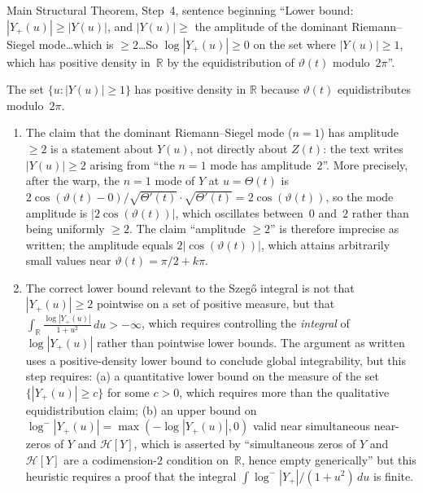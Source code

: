 \documentclass[11pt]{article}
\newcommand{\R}{\mathbb{R}}
\newcommand{\HH}{\mathcal{H}}
\begin{document}
\begin{description}[leftmargin=0pt]
\item[Location:]
Main Structural Theorem, Step~4, sentence beginning
``Lower bound: $|Y_+(u)|\ge|Y(u)|$, and $|Y(u)|\ge$ the amplitude of the dominant
Riemann--Siegel mode\ldots which is $\ge 2$\ldots So $\log|Y_+(u)|\ge 0$ on the set
where $|Y(u)|\ge 1$, which has positive density in~$\R$ by the equidistribution
of $\vartheta(t)$ modulo~$2\pi$''.

\item[Claim as written:]
The set $\{u:|Y(u)|\ge 1\}$ has positive density in $\R$ because
$\vartheta(t)$ equidistributes modulo~$2\pi$.

\item[What is relied on but not established in the text:]
\begin{enumerate}
\item The claim that the dominant Riemann--Siegel mode ($n=1$) has amplitude
$\ge 2$ is a statement about $Y(u)$, not directly about $Z(t)$:
the text writes $|Y(u)|\ge 2$ arising from ``the $n=1$ mode has amplitude~$2$''.
More precisely, after the warp, the $n=1$ mode of $Y$ at $u=\Theta(t)$ is
$2\cos(\vartheta(t)-0)/\sqrt{\Theta'(t)}\cdot\sqrt{\Theta'(t)}=2\cos(\vartheta(t))$,
so the mode amplitude is $|2\cos(\vartheta(t))|$, which oscillates between~$0$
and~$2$ rather than being uniformly $\ge 2$.
The claim ``amplitude $\ge 2$'' is therefore imprecise as written;
the amplitude equals $2|\cos(\vartheta(t))|$, which attains arbitrarily small
values near $\vartheta(t)=\pi/2+k\pi$.

\item The correct lower bound relevant to the Szeg\H{o} integral is not that
$|Y_+(u)|\ge 2$ pointwise on a set of positive measure, but that
$\int_\R\frac{\log|Y_+(u)|}{1+u^2}\,du>-\infty$, which requires controlling
the \emph{integral} of $\log|Y_+(u)|$ rather than pointwise lower bounds.
The argument as written uses a positive-density lower bound to conclude global
integrability, but this step requires:
(a) a quantitative lower bound on the measure of the set $\{|Y_+(u)|\ge c\}$
for some $c>0$, which requires more than the qualitative equidistribution claim;
(b) an upper bound on $\log^-|Y_+(u)|=\max(-\log|Y_+(u)|,0)$ valid near
simultaneous near-zeros of $Y$ and $\HH[Y]$, which is asserted by
``simultaneous zeros of $Y$ and $\HH[Y]$ are a codimension-$2$ condition
on~$\R$, hence empty generically'' but this heuristic requires a proof that
the integral $\int\log^-|Y_+|/(1+u^2)\,du$ is finite.


\end{enumerate}
\end{description}
\end{document}
